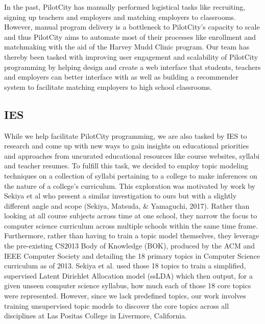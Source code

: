 In the past, PilotCity has manually performed logistical tasks like recruiting, signing up teachers and employers and matching employers to classrooms. However, manual program delivery is a bottleneck to PilotCity's capacity to scale and thus PilotCity aims to automate most of their processes like enrollment and matchmaking with the aid of the Harvey Mudd Clinic program. Our team has thereby been tasked with improving user engagement and scalability of PilotCity programming by helping design and create a web interface that students, teachers and employers can better interface with as well as building a recommender system to facilitate matching employers to high school classrooms. 

\subsection{IES}

While we help facilitate PilotCity programming, we are also tasked by IES to research and come up with new ways to gain insights on educational priorities and approaches from uncurated educational resources like course websites, syllabi and teacher resumes. To fulfill this task, we decided to employ topic modeling techniques on a collection of syllabi pertaining to a college to make inferences on the nature of a college's curriculum. This exploration was motivated by work by Sekiya et al who present a similar investigation to ours but with a slightly different angle and scope (Sekiya, Matsuda, \& Yamaguchi, 2017). Rather than looking at all course subjects across time at one school, they narrow the focus to computer science curriculum across multiple schools within the same time frame. Furthermore, rather than having to train a topic model themselves, they leverage the pre-existing CS2013 Body of Knowledge (BOK), produced by the ACM and IEEE Computer Society and detailing the 18 primary topics in Computer Science curriculum as of 2013. Sekiya et al. used those 18 topics to train a simplified, supervised Latent Dirichlet Allocation model (ssLDA) which then output, for a given unseen computer science syllabus, how much each of those 18 core topics were represented. However, since we lack predefined topics, our work involves training unsupervised topic models to discover the core topics across all disciplines at Las Positas College in Livermore, California.





